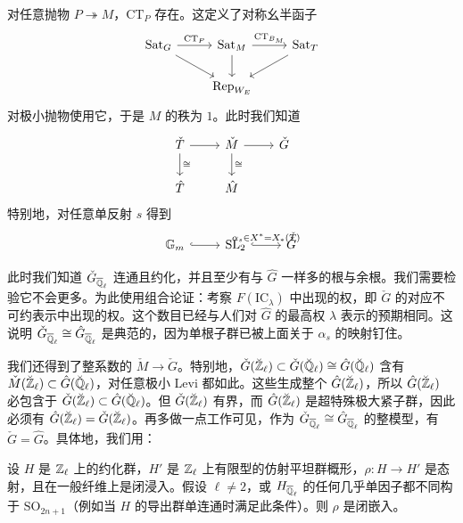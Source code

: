 对任意抛物 $P\twoheadrightarrow M$，$\mathrm{CT}_P$ 存在。这定义了对称幺半函子
\[
\begin{tikzcd}
\mathrm{Sat}_G \arrow[r, "\mathrm{CT}_P"] \arrow[dr] & \mathrm{Sat}_M \arrow[r, "\mathrm{CT}_{B_M}"] \arrow[d] & \mathrm{Sat}_T \arrow[dl] \\
& \Rep_{W_E} &
\end{tikzcd}
\]
对极小抛物使用它，于是 $M$ 的秩为 $1$。此时我们知道
\[
\begin{tikzcd}
\check T \arrow[r] \arrow[d, "\cong"] & \check M \arrow[r] \arrow[d, "\cong"] & \check G \\
\hat T & \hat M &
\end{tikzcd}
\]
特别地，对任意单反射 $s$ 得到
\[
\begin{tikzcd}
\GG_m \arrow[r, hook] & \mathrm{SL}_2 \arrow[r, hook, "\alpha_s\in X^*=X_*(\check T)"] & \check G
\end{tikzcd}
\]


此时我们知道 $\check G_{\overline{\mathbb{Q}}_\ell}$ 连通且约化，并且至少有与 $\hat G$ 一样多的根与余根。我们需要检验它不会更多。为此使用组合论证：考察 $F(\mathrm{IC}_\lambda)$ 中出现的权，即 $\check G$ 的对应不可约表示中出现的权。这个数目已经与人们对 $\hat G$ 的最高权 $\lambda$ 表示的预期相同。这说明 $\check G_{\overline{\mathbb{Q}}_\ell}\cong\hat G_{\overline{\mathbb{Q}}_\ell}$ 是典范的，因为单根子群已被上面关于 $\alpha_s$ 的映射钉住。

我们还得到了整系数的 $\check M\to\check G$。特别地，$\check G(\breve{\mathbb{Z}}_\ell)\subset\check G(\breve{\mathbb{Q}}_\ell)\cong\hat G(\breve{\mathbb{Q}}_\ell)$ 含有 $\check M(\breve{\mathbb{Z}}_\ell)\subset\hat G(\breve{\mathbb{Q}}_\ell)$，对任意极小 Levi 都如此。这些生成整个 $\hat G(\breve{\mathbb{Z}}_\ell)$，所以 $\hat G(\breve{\mathbb{Z}}_\ell)$ 必包含于 $\check G(\breve{\mathbb{Z}}_\ell)\subset\hat G(\breve{\mathbb{Q}}_\ell)$。但 $\check G(\breve{\mathbb{Z}}_\ell)$ 有界，而 $\hat G(\breve{\mathbb{Z}}_\ell)$ 是超特殊极大紧子群，因此必须有 $\hat G(\breve{\mathbb{Z}}_\ell)=\check G(\breve{\mathbb{Z}}_\ell)$。再多做一点工作可见，作为 $\check G_{\overline{\mathbb{Q}}_\ell}\cong\hat G_{\overline{\mathbb{Q}}_\ell}$ 的整模型，有 $\check G=\hat G$。具体地，我们用：

\begin{lemma}[Prasad--Yu]
设 $H$ 是 $\mathbb{Z}_\ell$ 上的约化群，$H'$ 是 $\mathbb{Z}_\ell$ 上有限型的仿射平坦群概形，$\rho\colon H\to H'$ 是态射，且在一般纤维上是闭浸入。假设 $\ell\ne2$，或 $H_{\overline{\mathbb{Q}}_\ell}$ 的任何几乎单因子都不同构于 $\mathrm{SO}_{2n+1}$（例如当 $H$ 的导出群单连通时满足此条件）。则 $\rho$ 是闭嵌入。
\end{lemma}

